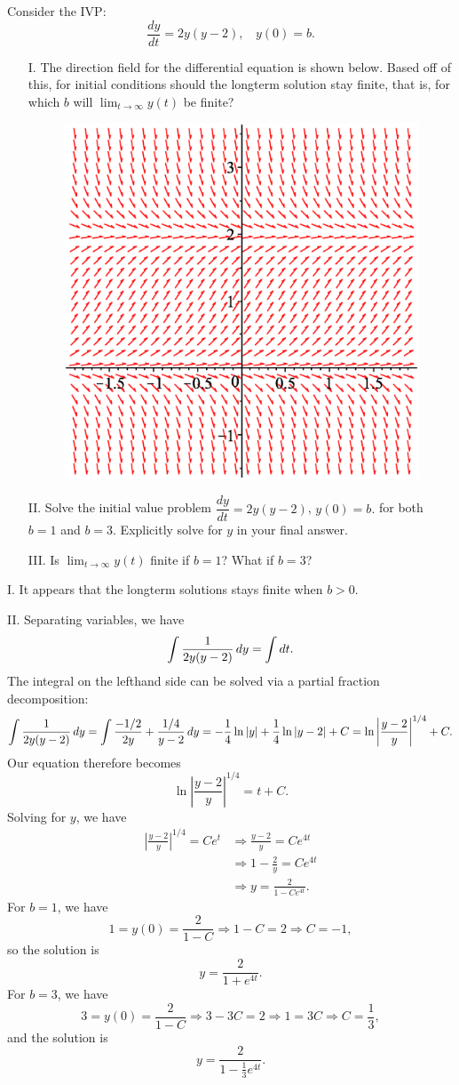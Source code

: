 \documentclass[]{ximera}
\begin{document}
\begin{problem} 

Consider the IVP:  $$\dfrac{dy}{dt} = 2y(y-2), ~ ~ ~ ~ y(0)=b.$$

\begin{itemize}
\item[I.] The direction field for the differential equation is shown below.  Based off of this, for initial conditions should the longterm solution stay finite, that is, for which $b$ will $\lim_{t \to \infty} y(t)$ be finite?

 \begin{figure}[h!]
 \centering
  \includegraphics[width=.5 \textwidth]{IVP2.eps}
\end{figure}

\item[II.] Solve the initial value problem $\dfrac{dy}{dt} = 2y(y-2)$, $y(0)=b.$ for both $b=1$ and $b=3$.  Explicitly solve for $y$ in your final answer.  
\item[III.] Is  $\lim_{t \to \infty} y(t)$ finite if $b=1$?  What if $b=3$?
\end{itemize}

\begin{solution}
I. It appears that the longterm solutions stays finite when $b > 0$. 

II. Separating variables, we have
$$
\int \frac{1}{2y(y-2)} \mathop{}\!d y = \int \mathop{}\!d t.
$$
The integral on the lefthand side can be solved via a partial fraction decomposition:
$$
\int \frac{1}{2y(y-2)} \mathop{}\!d y = \int \frac{-1/2}{2y} + \frac{1/4}{y-2} \mathop{}\!d y = -\frac{1}{4} \ln |y| + \frac{1}{4} \ln |y-2| + C = \ln \left|\frac{y-2}{y}\right|^{1/4} + C.
$$
Our equation therefore becomes
$$
\ln \left|\frac{y-2}{y}\right|^{1/4} = t + C.
$$
Solving for $y$, we have
\begin{align*}
\left|\frac{y-2}{y}\right|^{1/4} = C e^t &\Rightarrow \frac{y-2}{y} = C e^{4t} \\
&\Rightarrow 1- \frac{2}{y} = Ce^{4t} \\
&\Rightarrow y = \frac{2}{1 - C e^{4t}}.
\end{align*}
For $b= 1$, we have
$$
1 = y(0) = \frac{2}{1-C} \Rightarrow 1-C = 2 \Rightarrow C = -1,
$$
so the solution is 
$$
y= \frac{2}{1+e^{4t}}.
$$
For $b=3$, we have 
$$
3 = y(0) = \frac{2}{1-C} \Rightarrow 3-3C = 2 \Rightarrow 1=3C \Rightarrow C = \frac{1}{3},
$$
and the solution is
$$
y = \frac{2}{1-\frac{1}{3} e^{4t}}.
$$


\end{solution}
\end{problem}
\end{document}
